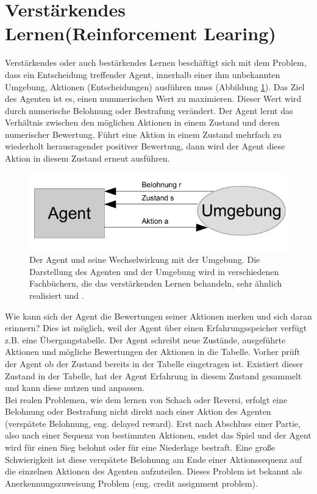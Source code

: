 \section{Verstärkendes Lernen(Reinforcement Learing)}
\label{sec:Verstärkendes Lernen}
Verstärkendes oder auch bestärkendes Lernen beschäftigt sich mit dem Problem, dass ein Entscheidung treffender Agent, innerhalb einer ihm unbekannten Umgebung, Aktionen (Entscheidungen) ausführen muss (Abbildung \ref{fig:agent_umgebung}). Das Ziel des Agenten ist es, einen nummerischen Wert zu maximieren. Dieser Wert wird durch numerische Belohnung oder Bestrafung verändert. Der Agent lernt das Verhältnis zwischen den möglichen Aktionen in einem Zustand und deren numerischer Bewertung. Führt eine Aktion in einem Zustand mehrfach zu wiederholt herausragender positiver Bewertung, dann wird der Agent diese Aktion in diesem Zustand erneut ausführen. \\

\begin{figure}[!htbp]
  \centering
  \includegraphics[scale = 1.4]{inhalt/abbildungen/agent_umgebung.pdf}
  \caption{Der Agent und seine Wechselwirkung mit der Umgebung. Die Darstellung des Agenten und der Umgebung wird in verschiedenen Fachbüchern, die das  verstärkenden Lernen behandeln, sehr ähnlich realisiert \cite[398]{Alpaydin} und \cite[290]{Ertel}.}
  \label{fig:agent_umgebung}
\end{figure} 

Wie kann sich der Agent die Bewertungen seiner Aktionen merken und sich daran erinnern? Dies ist möglich, weil der Agent über einen Erfahrungsspeicher verfügt z.B. eine Übergangstabelle. Der Agent schreibt neue Zustände, ausgeführte Aktionen und mögliche Bewertungen der Aktionen in die Tabelle. Vorher prüft der Agent ob der Zustand bereits in der Tabelle eingetragen ist. Existiert dieser Zustand in der Tabelle, hat der Agent Erfahrung in diesem Zustand gesammelt und kann diese nutzen und anpassen. \\
 
Bei realen Problemen, wie dem lernen von Schach oder Reversi, erfolgt eine Belohnung oder Bestrafung nicht direkt nach einer Aktion des Agenten (verspätete Belohnung, eng. delayed reward). Erst nach Abschluss einer Partie, also nach einer Sequenz von bestimmten Aktionen, endet das Spiel und der Agent wird für einen Sieg belohnt oder für eine Niederlage bestraft. Eine große Schwierigkeit ist diese verspätete Belohnung am Ende einer Aktionssequenz auf die einzelnen Aktionen des Agenten aufzuteilen. Dieses Problem ist bekannt als Anerkennungszuweisung Problem (eng. credit assignment problem). \\

